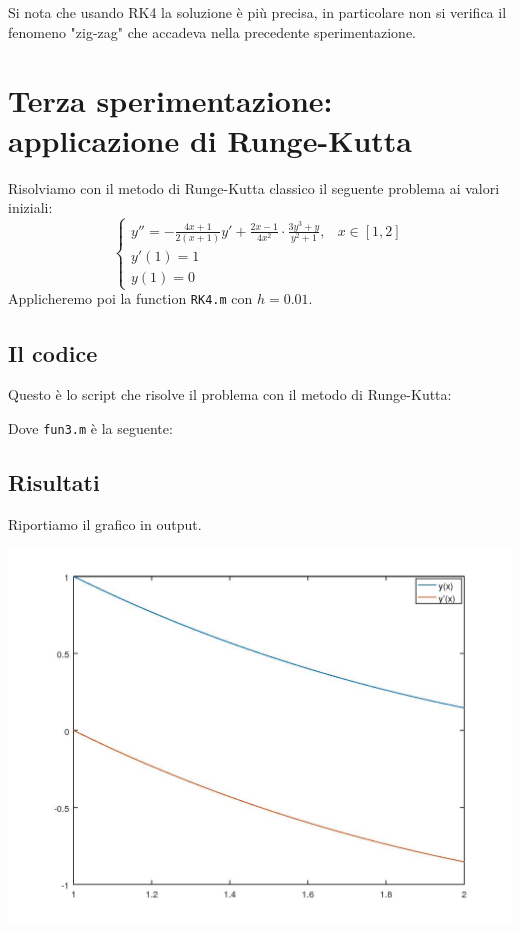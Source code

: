 \documentclass{article}
\begin{document}
	Si nota che usando RK4 la soluzione è più precisa, in 
	particolare non si verifica il fenomeno "zig-zag" che accadeva nella precedente sperimentazione.
	
	\section{Terza sperimentazione: applicazione di Runge-Kutta}
	Risolviamo con il metodo di Runge-Kutta classico il seguente problema ai valori iniziali:
	\begin{equation}
	\begin{cases}
	y''=-\frac{4x+1}{2(x+1)} y'+ \frac{2x-1}{4x^2} \cdot \frac{3y^3+y}{y^2+1}, & x \in\left[1, 2\right] \\
	y'(1)=1 \\
	y(1)=0
	\end{cases}
	\end{equation}
	Applicheremo poi la function { \tt RK4.m} con $h=0.01$.
	
	\subsection{Il codice}
	
	Questo è lo script che risolve il problema con il metodo di Runge-Kutta:
	
	
	
	Dove {\tt fun3.m} è la seguente:
	
	
	\subsection{Risultati}
	
	Riportiamo il grafico in output.
	
	\includegraphics[width=\textwidth]{2_3_soluzione.jpeg}
	
\end{document}
